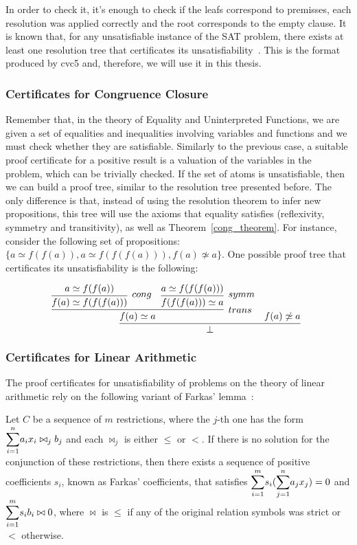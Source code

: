 In order to check it, it's enough to check if the leafs correspond to premisses, each resolution was applied correctly and the root corresponds to the empty clause. It is known that, for any unsatisfiable instance of the SAT problem, there exists at least one resolution tree that certificates its unsatisfiability~\cite{res_tree_complete}. This is the format produced by cvc5 and, therefore, we will use it in this thesis.

\subsubsection{Certificates for Congruence Closure}

Remember that, in the theory of Equality and Uninterpreted Functions, we are given a set of equalities and inequalities involving variables and functions and we must check whether they are satisfiable. Similarly to the previous case, a suitable proof certificate for a positive result is a valuation of the variables in the problem, which can be trivially checked. If the set of atoms is unsatisfiable, then we can build a proof tree, similar to the resolution tree presented before. The only difference is that, instead of using the resolution theorem to infer new propositions, this tree will use the axioms that equality satisfies (reflexivity, symmetry and transitivity), as well as Theorem~\ref{cong_theorem}. For instance, consider the following set of propositions: $\{a \simeq f(f(a)), a \simeq f(f(f(a))), f(a) \not\simeq a\}$. One possible proof tree that certificates its unsatisfiability is the following:

\[
  \infer[]{\bot}{\infer[trans]{f(a) \simeq a}{\infer[cong]{f(a) \simeq f(f(f(a)))}{a \simeq f(f(a))} & \infer[symm]{f(f(f(a))) \simeq a}{a \simeq f(f(f(a)))}} & f(a) \not\simeq a}
\]

\subsubsection{Certificates for Linear Arithmetic}

The proof certificates for unsatisfiability of problems on the theory of linear arithmetic rely on the following variant of Farkas' lemma~\cite{farkas_ref}:

\begin{theorem}\label{farkas_lemma}
  Let $C$ be a sequence of $m$ restrictions, where the $j$-th one has the form $\mathlarger{\sum}_{i = 1}^{n} a_{i} x_{i} \bowtie_{j} b_{j}$ and each $\bowtie_{j}$ is either $\le$ or $<$. If there is no solution for the conjunction of these restrictions, then there exists a sequence of positive coefficients $s_{i}$, known as Farkas' coefficients, that satisfies $\mathlarger{\sum}_{i = 1}^{m} s_{i} (\mathlarger{\sum}_{j = 1}^{n} a_{j} x_{j}) = 0$ and $\mathlarger{\sum}_{i = 1}^{m} s_{i} b_{i} \bowtie 0$, where $\bowtie$ is $\le$ if any of the original relation symbols was strict or $<$ otherwise.
\end{theorem}

